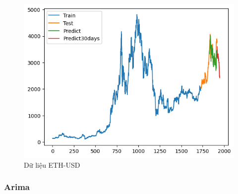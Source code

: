\documentclass[conference]{IEEEtran}
\begin{document}
\begin{figure}[H]
\begin{minipage}{0.15\textwidth}
		\includegraphics[width=1\textwidth]{Figure/TimesNet_ETH_91.png}
	\end{minipage}
	\caption{Dữ liệu ETH-USD}
	\label{fig:1}
\end{figure}
\subsubsection{Arima} 
\end{document}
